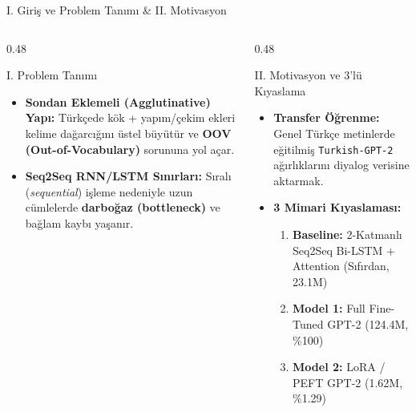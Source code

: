 \documentclass[aspectratio=169,10pt]{beamer}
\begin{document}
\begin{frame}{I. Giriş ve Problem Tanımı \& II. Motivasyon}
    \begin{columns}[T]
        \begin{column}{0.48\textwidth}
            \begin{block}{I. Problem Tanımı}
                \begin{itemize}
                    \item \textbf{Sondan Eklemeli (Agglutinative) Yapı:} Türkçede kök + yapım/çekim ekleri kelime dağarcığını üstel büyütür ve \textbf{OOV (Out-of-Vocabulary)} sorununa yol açar.
                    \item \textbf{Seq2Seq RNN/LSTM Sınırları:} Sıralı (\textit{sequential}) işleme nedeniyle uzun cümlelerde \textbf{darboğaz (bottleneck)} ve bağlam kaybı yaşanır.
                \end{itemize}
            \end{block}
        \end{column}
        \begin{column}{0.48\textwidth}
            \begin{block}{II. Motivasyon ve 3'lü Kıyaslama}
                \begin{itemize}
                    \item \textbf{Transfer Öğrenme:} Genel Türkçe metinlerde eğitilmiş \texttt{Turkish-GPT-2} ağırlıklarını diyalog verisine aktarmak.
                    \item \textbf{3 Mimari Kıyaslaması:}
                    \begin{enumerate}
                        \item \textbf{Baseline:} 2-Katmanlı Seq2Seq Bi-LSTM + Attention (Sıfırdan, 23.1M)
                        \item \textbf{Model 1:} Full Fine-Tuned GPT-2 (124.4M, \%100)
                        \item \textbf{Model 2:} LoRA / PEFT GPT-2 (1.62M, \%1.29)
                    \end{enumerate}
                \end{itemize}
            \end{block}
        \end{column}
    \end{columns}
\end{frame}
\end{document}
